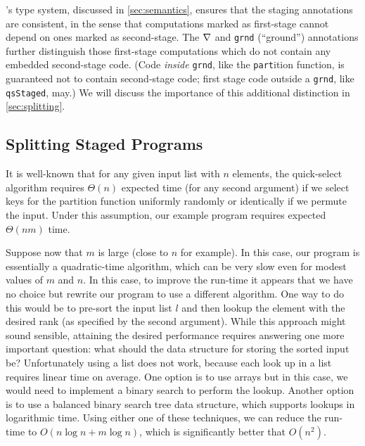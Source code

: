 \begin{abstrsyn}
\lang's type system, discussed in \ref{sec:semantics}, ensures that the staging
annotations are consistent, in the sense that computations marked as
first-stage cannot depend on ones marked as second-stage. The $\nabla$ and
\texttt{grnd} (``ground'') annotations further distinguish those first-stage computations
which do not contain any embedded second-stage code. (Code \emph{inside}
\texttt{grnd}, like the \texttt{part}ition function, is guaranteed not to
contain second-stage code; first stage code outside a \texttt{grnd}, 
like \texttt{qsStaged}, may.) We will
discuss the importance of this additional distinction in \ref{sec:splitting}.



\subsection{Splitting Staged Programs}



It is well-known that for any given input list with $n$ elements, the
quick-select algorithm requires $\Theta(n)$ expected time (for any
second argument) if we select keys for the partition function
uniformly randomly or identically if we permute the input. Under this
assumption, our example program requires expected $\Theta(nm)$ time.


Suppose now that $m$ is large (close to $n$ for example).  In this
case, our program is essentially a quadratic-time algorithm, which can
be very slow even for modest values of $m$ and $n$. In this case, to
improve the run-time it appears that we have no choice but rewrite our
program to use a different algorithm.  One way to do this would be to
pre-sort the input list $l$ and then lookup the element with the
desired rank (as specified by the second argument).  While this
approach might sound sensible, attaining the desired performance
requires answering one more important question: what should the data
structure for storing the sorted input be?  Unfortunately using a list
does not work, because each look up in a list requires linear time on
average. One option is to use arrays but in this case, we would need
to implement a binary search to perform the lookup.  Another option is
to use a balanced binary search tree data structure, which supports
lookups in logarithmic time.  Using either one of these techniques, we
can reduce the run-time to $O(n\log{n} + m\log{n})$, which is
significantly better that $O(n^2)$.



\end{abstrsyn}
